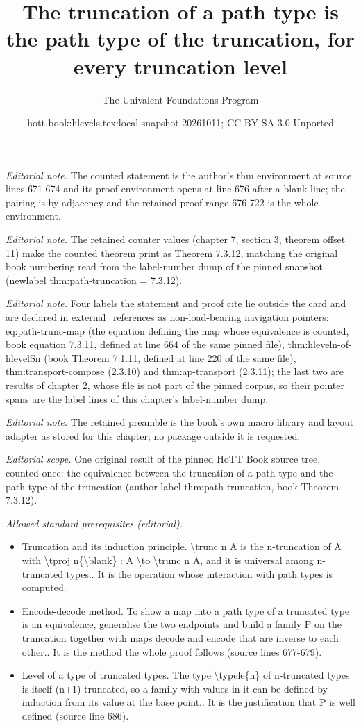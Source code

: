 \documentclass[10pt,a4paper]{article}
\title{The truncation of a path type is the path type of the truncation, for every truncation level}
\author{The Univalent Foundations Program}
\date{hott-book:hlevels.tex:local-snapshot-20261011; CC BY-SA 3.0 Unported}
\newcounter{chapter}
\theoremstyle{definition}
\theoremstyle{remark}
\numberwithin{equation}{section}
\begin{document}
\maketitle
\setcounter{chapter}{7}
\setcounter{section}{3}
\setcounter{thm}{11}
\noindent\textit{Editorial note.} The counted statement is the author's thm environment at source lines 671-674 and its proof environment opens at line 676 after a blank line; the pairing is by adjacency and the retained proof range 676-722 is the whole environment.\par\medskip
\noindent\textit{Editorial note.} The retained counter values (chapter 7, section 3, theorem offset 11) make the counted theorem print as Theorem 7.3.12, matching the original book numbering read from the label-number dump of the pinned snapshot (newlabel thm:path-truncation = 7.3.12).\par\medskip
\noindent\textit{Editorial note.} Four labels the statement and proof cite lie outside the card and are declared in external\_references as non-load-bearing navigation pointers: eq:path-trunc-map (the equation defining the map whose equivalence is counted, book equation 7.3.11, defined at line 664 of the same pinned file), thm:hleveln-of-hlevelSn (book Theorem 7.1.11, defined at line 220 of the same file), thm:transport-compose (2.3.10) and thm:ap-transport (2.3.11); the last two are results of chapter 2, whose file is not part of the pinned corpus, so their pointer spans are the label lines of this chapter's label-number dump.\par\medskip
\noindent\textit{Editorial note.} The retained preamble is the book's own macro library and layout adapter as stored for this chapter; no package outside it is requested.\par\medskip
\noindent\textit{Editorial scope.} One original result of the pinned HoTT Book source tree, counted once: the equivalence between the truncation of a path type and the path type of the truncation (author label thm:path-truncation, book Theorem 7.3.12).\par\medskip
\noindent\textit{Allowed standard prerequisites (editorial).}\begin{itemize}
\item Truncation and its induction principle. \textbackslash{}trunc n A is the n-truncation of A with \textbackslash{}tproj n\{\textbackslash{}blank\} : A \textbackslash{}to \textbackslash{}trunc n A, and it is universal among n-truncated types.. It is the operation whose interaction with path types is computed.
\item Encode-decode method. To show a map into a path type of a truncated type is an equivalence, generalise the two endpoints and build a family P on the truncation together with maps decode and encode that are inverse to each other.. It is the method the whole proof follows (source lines 677-679).
\item Level of a type of truncated types. The type \textbackslash{}typele\{n\} of n-truncated types is itself (n+1)-truncated, so a family with values in it can be defined by induction from its value at the base point.. It is the justification that P is well defined (source line 686).
\end{itemize}\medskip
\end{document}
